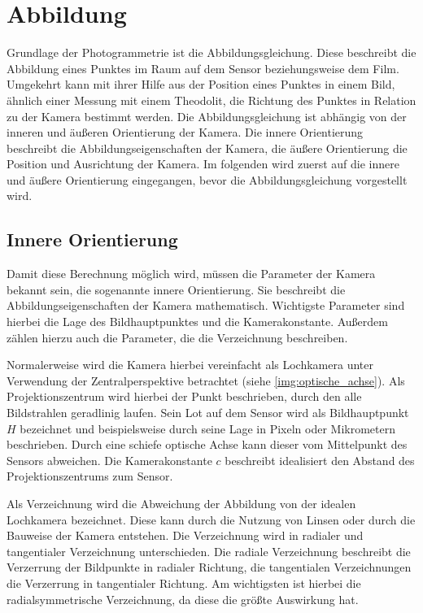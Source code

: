 \documentclass[./00PhotoBox.tex]{subfiles}
\begin{document}
\section{Abbildung}

Grundlage der Photogrammetrie ist die Abbildungsgleichung. Diese beschreibt die Abbildung eines Punktes im Raum auf dem Sensor beziehungsweise dem Film. Umgekehrt kann mit ihrer Hilfe aus der Position eines Punktes in einem Bild, ähnlich einer Messung mit einem Theodolit, die Richtung des Punktes in Relation zu der Kamera bestimmt werden. Die Abbildungsgleichung ist abhängig von der inneren und äußeren Orientierung der Kamera. Die innere Orientierung beschreibt die Abbildungseigenschaften der Kamera, die äußere Orientierung die Position und Ausrichtung der Kamera. Im folgenden wird zuerst auf die innere und äußere Orientierung eingegangen, bevor die Abbildungsgleichung vorgestellt wird.

\subsection{Innere Orientierung}
\label{s:innereorientierung}
Damit diese Berechnung möglich wird, müssen die Parameter der Kamera bekannt sein, die sogenannte innere Orientierung. Sie beschreibt die Abbildungseigenschaften der Kamera mathematisch. Wichtigste Parameter sind hierbei die Lage des Bildhauptpunktes und die Kamerakonstante. Außerdem zählen hierzu auch die Parameter, die die Verzeichnung beschreiben. \citep[S. 179f]{luhmann}

Normalerweise wird die Kamera hierbei vereinfacht als Lochkamera unter Verwendung der Zentralperspektive betrachtet (siehe \autoref{img:optische_achse}). Als Projektionszentrum wird hierbei der Punkt beschrieben, durch den alle Bildstrahlen geradlinig laufen. Sein Lot auf dem Sensor wird als Bildhauptpunkt $H$ bezeichnet und beispielsweise durch seine Lage in Pixeln oder Mikrometern beschrieben. Durch eine schiefe optische Achse kann dieser vom Mittelpunkt des Sensors abweichen. Die Kamerakonstante $c$ beschreibt idealisiert den Abstand des Projektionszentrums zum Sensor. \citep[S. 177]{luhmann}

Als Verzeichnung wird die Abweichung der Abbildung von der idealen Lochkamera bezeichnet. Diese kann durch die Nutzung von Linsen oder durch die Bauweise der Kamera entstehen. Die Verzeichnung wird in radialer und tangentialer Verzeichnung unterschieden. Die radiale Verzeichnung beschreibt die Verzerrung der Bildpunkte in radialer Richtung, die tangentialen Verzeichnungen die Verzerrung in tangentialer Richtung. Am wichtigsten ist hierbei die radialsymmetrische Verzeichnung, da diese die größte Auswirkung hat. \citep[S. 178]{luhmann}
\end{document}
